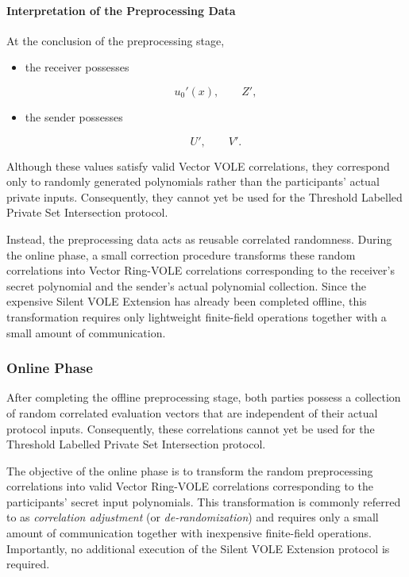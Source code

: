 \documentclass[11pt,a4paper]{article}
\begin{document}
 

\paragraph{Interpretation of the Preprocessing Data}

At the conclusion of the preprocessing stage,

\begin{itemize}

\item the receiver possesses

\[
u_0'(x),
\qquad
Z',
\]

\item the sender possesses

\[
U',
\qquad
V'.
\]

\end{itemize}

Although these values satisfy valid Vector VOLE correlations, they correspond only to randomly generated
polynomials rather than the participants' actual private inputs. Consequently, they cannot yet be used for
the Threshold Labelled Private Set Intersection protocol.

Instead, the preprocessing data acts as reusable correlated randomness. During the online phase, a small
correction procedure transforms these random correlations into Vector Ring-VOLE correlations corresponding
to the receiver's secret polynomial and the sender's actual polynomial collection. Since the expensive Silent
VOLE Extension has already been completed offline, this transformation requires only lightweight finite-field
operations together with a small amount of communication.
 

\subsubsection{Online Phase}

After completing the offline preprocessing stage, both parties possess a collection of random correlated
evaluation vectors that are independent of their actual protocol inputs. Consequently, these correlations
cannot yet be used for the Threshold Labelled Private Set Intersection protocol.

The objective of the online phase is to transform the random preprocessing correlations into valid
Vector Ring-VOLE correlations corresponding to the participants' secret input polynomials. This
transformation is commonly referred to as \emph{correlation adjustment} (or \emph{de-randomization})
and requires only a small amount of communication together with inexpensive finite-field operations.
Importantly, no additional execution of the Silent VOLE Extension protocol is required.
\end{document}
